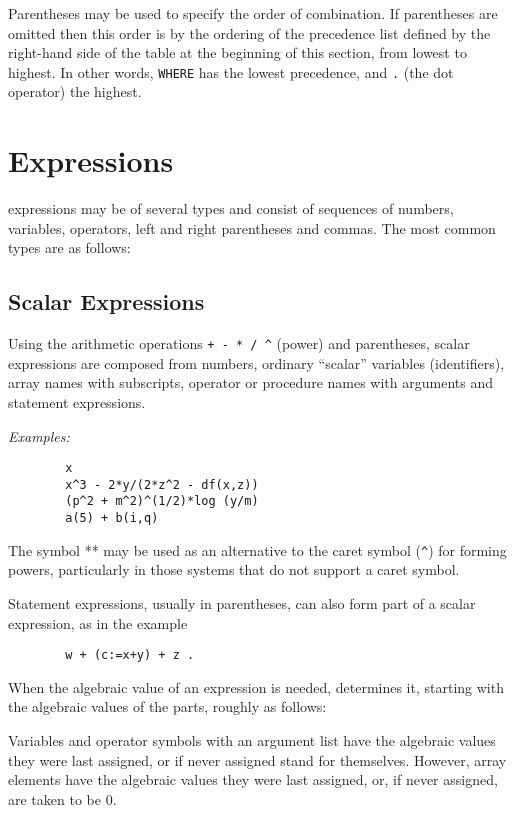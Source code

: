Parentheses may be used to specify the order of combination.  If
parentheses are omitted then this order is by the ordering of the
precedence list defined by the right-hand side
of the {\tt <infix operator>} table
at the beginning of this section,
from lowest to highest.  In other words, {\tt WHERE} has the lowest
precedence, and {\tt .} (the dot operator) the highest.

\chapter{Expressions}

{\REDUCE} expressions may be of several types and consist
of sequences of numbers, variables, operators, left and right parentheses
and commas.  The most common types are as follows:

\section{Scalar Expressions}

Using the arithmetic operations {\tt + - * / \verb|^|}
(power) and parentheses, scalar expressions are composed from numbers,
ordinary ``scalar'' variables (identifiers), array names with subscripts,
operator or procedure names with arguments and statement expressions.

{\it Examples:}
\begin{verbatim}
        x
        x^3 - 2*y/(2*z^2 - df(x,z))
        (p^2 + m^2)^(1/2)*log (y/m)
        a(5) + b(i,q)
\end{verbatim}
The symbol ** may be used as an alternative to the caret symbol (\verb+^+)
for forming powers, particularly in those systems that do not support a
caret symbol.

Statement expressions, usually in parentheses, can also form part of
a scalar expression, as in the example
\begin{verbatim}
        w + (c:=x+y) + z .
\end{verbatim}
When the algebraic value of an expression is needed, {\REDUCE} determines it,
starting with the algebraic values of the parts, roughly as follows:

Variables and operator symbols with an argument list have the algebraic
values they were last assigned, or if never assigned stand for themselves.
However, array elements have the algebraic values they were last assigned,
or, if never assigned, are taken to be 0.

